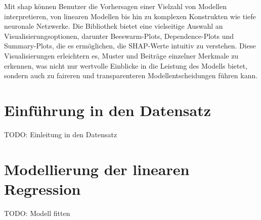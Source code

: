 Mit \textsf{shap} können Benutzer die Vorhersagen einer Vielzahl von Modellen interpretieren, 
von linearen Modellen bis hin zu komplexen Konstrukten wie tiefe neuronale Netzwerke. 
Die Bibliothek bietet eine vielseitige Auswahl an Visualisierungsoptionen, darunter Beeswarm-Plots, Dependence-Plots und 
Summary-Plots, die es ermöglichen, die SHAP-Werte intuitiv zu verstehen.
Diese Visualisierungen erleichtern es, Muster und Beiträge einzelner Merkmale zu erkennen, 
was nicht nur wertvolle Einblicke in die Leistung des Modells bietet, sondern auch zu faireren und transparenteren 
Modellentscheidungen führen kann. 

\section{Einführung in den Datensatz}

TODO: Einleitung in den Datensatz

\section{Modellierung der linearen Regression}

TODO: Modell fitten
